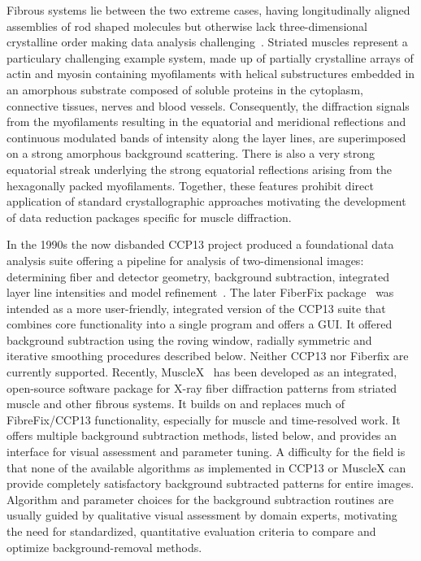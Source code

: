 \documentclass[11pt,onecolumn]{IEEEtran}
\begin{document}
Fibrous systems lie between the two extreme cases, having longitudinally aligned assemblies of rod shaped molecules but otherwise lack three-dimensional crystalline order making data analysis challenging~\cite{Fraser_a13879}. Striated muscles represent a particulary challenging example system, made up of partially crystalline arrays of actin and myosin containing myofilaments with helical substructures embedded in an amorphous substrate composed of soluble proteins in the cytoplasm, connective tissues, nerves and blood vessels. Consequently, the diffraction signals from the myofilaments resulting in the equatorial and meridional reflections and continuous modulated bands of intensity along the layer lines, are superimposed on a strong amorphous background scattering. There is also a very strong equatorial streak underlying the strong equatorial reflections arising from the hexagonally packed myofilaments. Together, these features prohibit direct application of standard crystallographic approaches motivating the development of data reduction packages specific for muscle diffraction. 

In the 1990s the now disbanded CCP13 project produced a foundational data analysis suite offering a pipeline for analysis of two-dimensional images: determining fiber and detector geometry, background subtraction, integrated layer line intensities and model refinement~\cite{squire2003ccp13_software, shotton1998ccp13_software_dev, denny1995ccp13_updates}. The later FiberFix package~\cite{HeEtAl2007} was intended as a more user-friendly, integrated version of the CCP13 suite that combines core functionality into a single program and offers a GUI. It offered background subtraction using the roving window, radially symmetric and iterative smoothing procedures described below. Neither CCP13 nor Fiberfix are currently supported. Recently, MuscleX~\cite{JiratrakanvongEtAl2024} has been developed as an integrated, open-source software package for X-ray fiber diffraction patterns from striated muscle and other fibrous systems. It builds on and replaces much of FibreFix/CCP13 functionality, especially for muscle and time-resolved work. It offers multiple background subtraction methods, listed below, and provides an interface for visual assessment and parameter tuning. A difficulty for the field is that none of the available algorithms as implemented in CCP13 or MuscleX can provide completely satisfactory background subtracted patterns for entire images. Algorithm and parameter choices for the background subtraction routines are usually guided by qualitative visual assessment by domain experts, motivating the need for standardized, quantitative evaluation criteria to compare and optimize background-removal methods.
\end{document}
